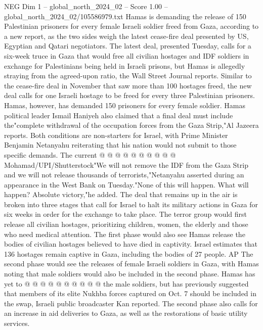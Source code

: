 \begin{textsample}{NEG Dim 1 – global\_north\_2024\_02 – Score 1.00 – global\_north\_2024\_02/105586979.txt}  \label{ex:f1_neg_181}
Hamas is demanding the release of 150 Palestinian prisoners for every female Israeli soldier freed from Gaza, according to a new report, as the two sides weigh the latest cease-fire deal presented by US, Egyptian and Qatari negotiators.
The latest deal, presented Tuesday, calls for a six-week truce in Gaza that would free all civilian hostages and IDF soldiers in exchange for Palestinians being held in Israeli prisons, but Hamas is allegedly straying from the agreed-upon ratio, the Wall Street Journal reports.
Similar to the cease-fire deal in November that saw more than 100 hostages freed, the new deal calls for one Israeli hostage to be freed for every three Palestinian prisoners.
Hamas, however, has demanded 150 prisoners for every female soldier.
Hamas political leader Ismail Haniyeh also claimed that a final deal must include the"complete withdrawal of the occupation forces from the Gaza Strip,"Al Jazeera reports.
Both conditions are non-starters for Israel, with Prime Minister Benjamin Netanyahu reiterating that his nation would not submit to those specific demands.
The current @ @ @ @ @ @ @ @ @ @ Mohamad/UPI/Shutterstock"We will not remove the IDF from the Gaza Strip and we will not release thousands of terrorists,"Netanyahu asserted during an appearance in the West Bank on Tuesday."None of this will happen.
What will happen?
Absolute victory,"he added.
The deal that remains up in the air is broken into three stages that call for Israel to halt its military actions in Gaza for six weeks in order for the exchange to take place.
The terror group would first release all civilian hostages, prioritizing children, women, the elderly and those who need medical attention.
The first phase would also see Hamas release the bodies of civilian hostages believed to have died in captivity.
Israel estimates that 136 hostages remain captive in Gaza, including the bodies of 27 people.
AP The second phase would see the releases of female Israeli soldiers in Gaza, with Hamas noting that male soldiers would also be included in the second phase.
Hamas has yet to @ @ @ @ @ @ @ @ @ @ the male soldiers, but has previously suggested that members of its elite Nukhba forces captured on Oct. 7 should be included in the swap, Israeli public broadcaster Kan reported.
The second phase also calls for an increase in aid deliveries to Gaza, as well as the restorations of basic utility services.

\end{textsample}
